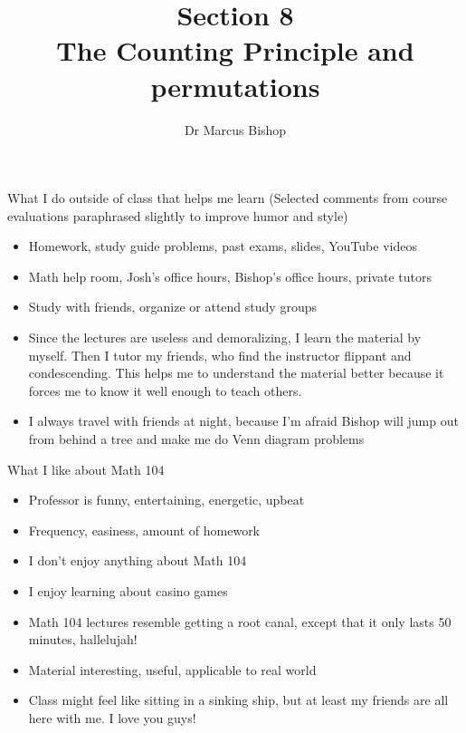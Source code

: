 \documentclass[handout]{beamer}
\title[\S8]{Section 8\\The Counting Principle and permutations}
\author{Dr Marcus Bishop}
\theoremstyle{definition}
\begin{document}
\begin{frame}\titlepage\end{frame}
\LogoOff

\begin{frame}
{What I do outside of class that helps me learn}
(Selected comments from course evaluations
paraphrased slightly to improve humor and style)
\begin{itemize}
\item Homework, study guide problems, past exams, slides,
YouTube videos
\item Math help room, Josh's office hours, Bishop's office hours,
private tutors
\item Study with friends, organize or attend study groups
\item Since the lectures are useless and demoralizing, I learn the
material by myself. Then I tutor my friends, who
find the instructor flippant and condescending.
This helps me to understand the material better because
it forces me to know it well enough to teach others.
\item I always travel with friends at night, because I'm afraid
Bishop will jump out from behind a tree and make me do Venn diagram
problems
\end{itemize}
\end{frame}

\begin{frame}{What I like about Math 104}
\begin{itemize}
\item Professor is funny, entertaining, energetic, upbeat
\item Frequency, easiness, amount of homework
\item I don't enjoy anything about Math 104
\item I enjoy learning about casino games
\item Math 104 lectures resemble
getting a root canal, except that it only lasts 50 minutes, hallelujah!
\item Material interesting, useful, applicable to real world
\item Class might feel like sitting in a sinking ship,
but at least my friends are all here with me. I love you guys!
\end{itemize}
\end{frame}
\end{document}
